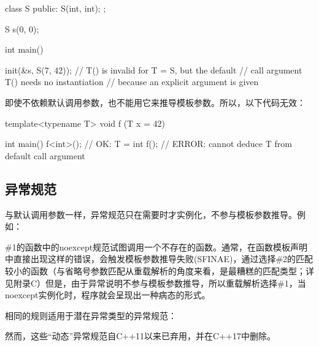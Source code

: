 \begin{cpp}
class S {
	public:
	S(int, int);
};

S s(0, 0);

int main()

{
	init(&s, S(7, 42)); // T() is invalid for T = S, but the default
	// call argument T() needs no instantiation
	// because an explicit argument is given
}
\end{cpp}

即使不依赖默认调用参数，也不能用它来推导模板参数。所以，以下代码无效：

\begin{cpp}
template<typename T>
void f (T x = 42) { }

int main() {
	f<int>(); // OK: T = int
	f(); // ERROR: cannot deduce T from default call argument
}
\end{cpp}

\subsection{异常规范}

与默认调用参数一样，异常规范只在需要时才实例化，不参与模板参数推导。例如：


\#1的函数中的noexcept规范试图调用一个不存在的函数。通常，在函数模板声明中直接出现这样的错误，会触发模板参数推导失败(SFINAE)，通过选择\#2的匹配较小的函数（与省略号参数匹配从重载解析的角度来看，是最糟糕的匹配类型；详见附录C）但是，由于异常说明不参与模板参数推导，所以重载解析选择\#1，当noexcept实例化时，程序就会呈现出一种病态的形式。

相同的规则适用于潜在异常类型的异常规范：


然而，这些“动态”异常规范自C++11以来已弃用，并在C++17中删除。


















